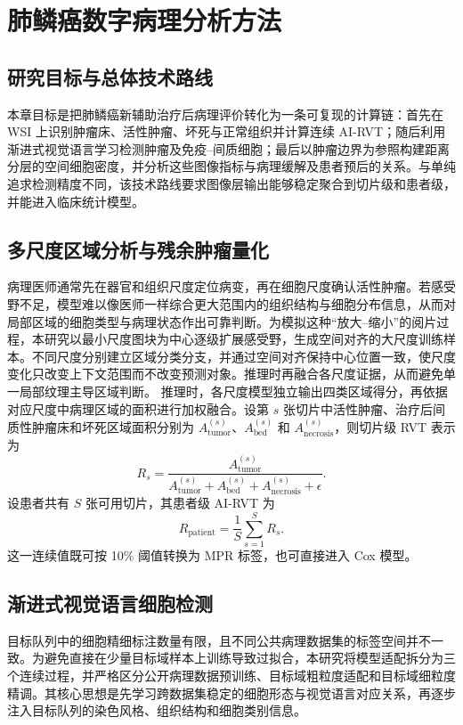 \section{肺鳞癌数字病理分析方法}
\subsection{研究目标与总体技术路线}
本章目标是把肺鳞癌新辅助治疗后病理评价转化为一条可复现的计算链：首先在 WSI 上识别肿瘤床、活性肿瘤、坏死与正常组织并计算连续 AI-RVT；随后利用渐进式视觉语言学习检测肿瘤及免疫--间质细胞；最后以肿瘤边界为参照构建距离分层的空间细胞密度，并分析这些图像指标与病理缓解及患者预后的关系。与单纯追求检测精度不同，该技术路线要求图像层输出能够稳定聚合到切片级和患者级，并能进入临床统计模型。

\subsection{多尺度区域分析与残余肿瘤量化}
病理医师通常先在器官和组织尺度定位病变，再在细胞尺度确认活性肿瘤。若感受野不足，模型难以像医师一样综合更大范围内的组织结构与细胞分布信息，从而对局部区域的细胞类型与病理状态作出可靠判断。为模拟这种“放大--缩小”的阅片过程，本研究以最小尺度图块为中心逐级扩展感受野，生成空间对齐的大尺度训练样本。不同尺度分别建立区域分类分支，并通过空间对齐保持中心位置一致，使尺度变化只改变上下文范围而不改变预测对象。推理时再融合各尺度证据，从而避免单一局部纹理主导区域判断。
推理时，各尺度模型独立输出四类区域得分，再依据对应尺度中病理区域的面积进行加权融合。设第 $s$ 张切片中活性肿瘤、治疗后间质性肿瘤床和坏死区域面积分别为 $A^{(s)}_{\mathrm{tumor}}$、$A^{(s)}_{\mathrm{bed}}$ 和 $A^{(s)}_{\mathrm{necrosis}}$，则切片级 RVT 表示为
\begin{equation}
R_s=\frac{A^{(s)}_{\mathrm{tumor}}}
{A^{(s)}_{\mathrm{tumor}}+A^{(s)}_{\mathrm{bed}}+A^{(s)}_{\mathrm{necrosis}}+\epsilon}.
\end{equation}
设患者共有 $S$ 张可用切片，其患者级 AI-RVT 为
\begin{equation}
R_{\mathrm{patient}}=\frac{1}{S}\sum_{s=1}^{S}R_s.
\end{equation}
这一连续值既可按 10\% 阈值转换为 MPR 标签，也可直接进入 Cox 模型。

\subsection{渐进式视觉语言细胞检测}
目标队列中的细胞精细标注数量有限，且不同公共病理数据集的标签空间并不一致。为避免直接在少量目标域样本上训练导致过拟合，本研究将模型适配拆分为三个连续过程，并严格区分公开病理数据预训练、目标域粗粒度适配和目标域细粒度精调。其核心思想是先学习跨数据集稳定的细胞形态与视觉语言对应关系，再逐步注入目标队列的染色风格、组织结构和细胞类别信息。

